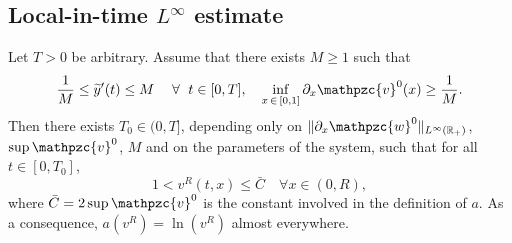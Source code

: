 \documentclass[AHL,Unicode,longabstracts,published]{cedram}
\newcommand{\R}{\mathbb{R}}
\newcommand{\p}{\partial}
\newcommand{\tv}{\mathpzc{v}}
\newcommand{\tw}{\mathpzc{w}}
\newcommand{\ty}{\widetilde{y}}
\let\oldforall\forall
\renewcommand*{\forall}{\mathrel{\oldforall}}
\begin{document}
\subsection{Local-in-time \texorpdfstring{$L^\infty$}{Linfty} estimate}

\begin{lemm}\label{lem:infty-est}
Let $T>0$ be arbitrary. Assume that there exists $M\geq 1$ such that
\begin{equation}\label{hyp:M}
\frac{1}{M} \leq \ty'(t)\leq M \quad \forall \ t \in [0,T],\quad \inf_{x\,\in\,[0,1]}\p_x \tv^0(x) \geq \frac{1}{M}.
\end{equation}
Then there exists $T_0\in (0,T]$, depending only on $\|\p_x \tw^0\|_{L^\infty(\R_+)}$, $\sup \tv^0$, $M$ and on the parameters of the system, such that for all $t\in [0,T_0]$,
\begin{equation}
1 < v^R(t,x) \leq \bar C\quad \forall x \in (0,R),
\end{equation}
where $\bar C = 2 \sup \tv^0 $ is the constant involved in the definition of $a$. As a consequence, $a(v^R)= \ln (v^R)$ almost everywhere.
\end{lemm}
\end{document}

